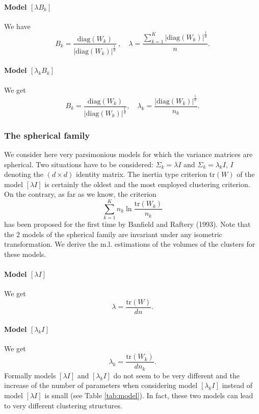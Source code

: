 \documentclass[12pt]{article}
\begin{document}
\paragraph{Model $[\lambda B_k]$}
We have
\begin{equation}
  B_k=\frac{\mbox{diag}(W_k)} {|\mbox{diag}(W_k)|^{\frac{1}{d}}} \ ,
  \quad \lambda=\frac
  {\sum_{k=1}^{K}|\mbox{diag}(W_k)|^{\frac{1}{d}}}{n}.
\end{equation}

\paragraph{Model $[\lambda_{k} B_k]$}
We get
\begin{equation}
  B_k=\frac{\mbox{diag}(W_k)} {|\mbox{diag}(W_k)|^{\frac{1}{d}}},
  \quad \lambda_k=\frac {|\mbox{diag}(W_k)|^{\frac{1}{d}}}{n_k}.
\end{equation}

\subsubsection{The spherical family}
We consider here very parsimonious models for which the variance matrices are spherical. Two
situations have to be considered: $\Sigma_k=\lambda I$ and $\Sigma_{k}=\lambda_{k}I$, $I$
denoting the $(d \times d)$ identity matrix. The inertia type criterion tr$(W)$ of the model
$[\lambda I]$ is certainly the oldest and the most employed clustering criterion.  On the
contrary, as far as we know, the criterion
\begin{equation}
  \sum_{k=1}^{K} n_{k} \ln \frac{\mbox{tr} (W_k)}{n_k}
\end{equation}
has been proposed for the first time by Banfield and Raftery (1993). Note that the 2 models of
the spherical family are invariant under any isometric transformation. We derive the m.l.
estimations of the volumes of the clusters for these models.

\paragraph{\bf Model $[\lambda I]$}
We get
\begin{equation}
  \lambda=\frac{\mbox{tr}(W)}{dn}.
\end{equation}

\paragraph{Model $[\lambda_{k} I]$}
We get
\begin{equation}
  \lambda_k=\frac{\mbox{tr}(W_k)}{dn_k}.
\end{equation}
Formally models $[\lambda I]$ and $[\lambda_k I]$ do not seem to be very different and the
increase of the number of parameters when considering model $[\lambda_k I]$ instead of model
$[\lambda I]$ is small (see Table \ref{tab:model}). In fact, these two models can lead to very
different clustering structures.
\end{document}
